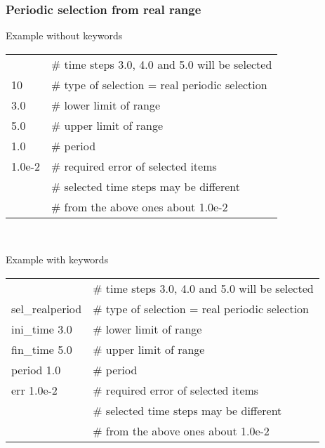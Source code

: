\subsubsection{Periodic selection from real range}
Example without keywords
\begin{center}
\begin{tabular}{|ll|}
\hline
        & \# time steps 3.0, 4.0 and 5.0 will be selected \\
10      & \# type of selection = real periodic selection  \\  
3.0     & \# lower limit of range                         \\
5.0     & \# upper limit of range                         \\
1.0     & \# period                                       \\
1.0e-2  & \# required error of selected items             \\
        & \# selected time steps may be different         \\
        & \# from the above ones about 1.0e-2             \\
\hline
\end{tabular}\\
\end{center}
Example with keywords
\begin{center}
\begin{tabular}{|ll|}
\hline
                & \# time steps 3.0, 4.0 and 5.0 will be selected \\
sel\_realperiod & \# type of selection = real periodic selection  \\  
ini\_time   3.0 & \# lower limit of range                         \\
fin\_time   5.0 & \# upper limit of range                         \\
period      1.0 & \# period                                       \\
err      1.0e-2 & \# required error of selected items             \\
                & \# selected time steps may be different         \\
                & \# from the above ones about 1.0e-2             \\
\hline
\end{tabular}\\
\end{center}



